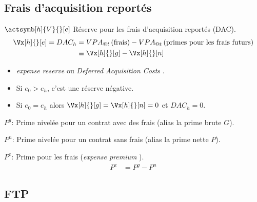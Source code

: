 \documentclass[10pt, french]{article}
\begin{document}
\begin{multicols*}{2}
\subsection*{Frais d'acquisition reportés}

\begin{description}
	\item	$\actsymb[h]{V}{}[e]$	Réserve pour les frais d'acquisition reportés (DAC).
		\begin{align*}
		\Vx[h]{}[e] =	DAC_{h}
		&=	VPA_{@t}\left(\shortstack{frais}\right) - VPA_{@t}\left(\shortstack{primes pour les frais futurs}\right)	\\
		&\equiv	\Vx[h]{}[g] - \Vx[h]{}[n]		
		\end{align*}
		\begin{itemize}[leftmargin = *]
		\item	\og \textit{expense reserve} \fg{} ou \og \textit{Deferred Acquisition Costs} \fg{}.
		\item	Si $e_{0} > e_{h}$, c'est une réserve négative.
		\item	Si $e_{0} = e_{h}$ alors $\Vx[h]{}[g] = \Vx[h]{}[n] = 0$ et $DAC_{h} = 0$.
		\end{itemize}
	\item	$P^{g}$:	Prime nivelée pour un contrat avec des frais (alias la prime brute $G$).
	\item	$P^{n}$:	Prime nivelée pour un contrat sans frais (alias la prime nette $P$).
	\item	$P^{e}$:	Prime pour les frais (\og \textit{expense premium} \fg{}).
		\begin{align*}
		P^{e}
		&=	P^{g} - P^{n}
		\end{align*}
\end{description}

\subsection*{FTP}


\end{multicols*}
\end{document}
